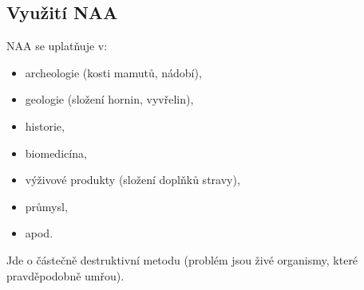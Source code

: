 \subsection{Využití NAA}

NAA se uplatňuje v:

\begin{itemize}
    \item archeologie (kosti mamutů, nádobí),
    \item geologie (složení hornin, vyvřelin),
    \item historie,
    \item biomedicína,
    \item výživové produkty (složení doplňků stravy),
    \item průmysl,
    \item apod.
\end{itemize}

Jde o částečně destruktivní metodu (problém jsou živé organismy, které pravděpodobně umřou).